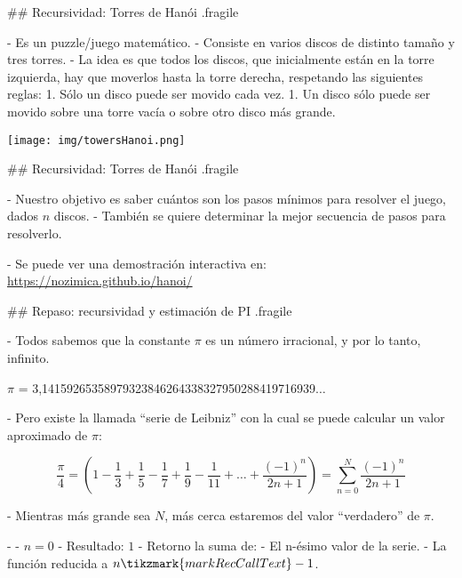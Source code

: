 ## Recursividad: Torres de Hanói {.fragile}

- Es un puzzle/juego matemático.
- Consiste en varios discos de distinto tamaño y tres torres.
- La idea es que todos los discos, que inicialmente están en la torre
izquierda, hay que moverlos hasta la torre derecha, respetando las siguientes reglas:
    1. Sólo un disco puede ser movido cada vez.
    1. Un disco sólo puede ser movido sobre una torre vacía o sobre otro disco más grande.

\centering    \texttt{[image: img/towersHanoi.png]}

## Recursividad: Torres de Hanói {.fragile}

- Nuestro objetivo es saber cuántos son los pasos mínimos para resolver el juego, dados
$n$ discos.
- También se quiere determinar la mejor secuencia de pasos para resolverlo.

- Se puede ver una demostración interactiva en: \url{https://nozimica.github.io/hanoi/}

## Repaso: recursividad y estimación de PI {.fragile}


- Todos sabemos que la constante $\pi$ es un número irracional, y por lo tanto, infinito.

\begin{center}
\textsf{$\pi$ = 3,14159265358979323846264338327950288419716939$\ldots$}
\end{center}



- Pero existe la llamada ``serie de Leibniz'' con la cual se puede calcular un valor aproximado de $\pi$:

\vspace{-3ex}
$$ \frac{\pi}{4} = \left( 1 - \frac{1}{3} + \frac{1}{5} - \frac{1}{7} + \frac{1}{9} - \frac{1}{11} + \ldots + \frac{(-1)^{n}}{2n + 1} \right) = \sum_{n=0}^{N} \frac{(-1)^{n}}{2n + 1} $$



- Mientras más grande sea $N$, más cerca estaremos del valor ``verdadero'' de $\pi$.




- 
    - $n = 0$
    - Resultado: $1$
-  Retorno la suma de:
    - El n-ésimo valor de la serie.
    - La función reducida a $n \tikzmark{markRecCallText}- 1$.

